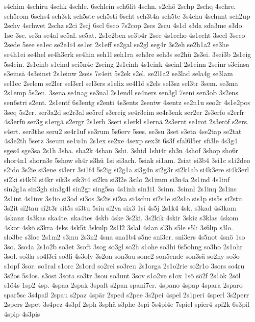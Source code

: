 {s4chim
4schiru
4schk
4schle.
6schlein
sch6lit
4schn.
s2chö
2schp
2schq
4schre.
sch5rom
6schs4
sch3sk
sch5ste
sch5sti
6scht
sch3t4a
sch5te
3s4chu
4schunt
sch2up
2schv
4schwet
2schz
s2ci
2scj
6scl
6sco
7s2cop
2scs
2scu
4s1d
s3da
sda3me
s3do
1se
3se.
se3a
se4al
se5al.
se5at.
2s1e2ben
se3b4r
2sec
4s1echo
4s1echt
3secl
3seco
2sede
5see
se1ec
se2e1i4
se1er
2s1eff
se2gal
se2gl
seg4r
3s2eh
se2h1a2
se3he
se4h1ei
se4hel
se4h3erk
se4hin
seh1l
seh1ra
seh3re
seh3s
se2hü
2s3ei.
3sei3b
2s1eig
5s4ein.
2s1einb
s1eind
sei5n4e
2seing
2s1einh
4s1eink
4seinl
2s1einn
2seinr
s3einsa
s3einsä
4s3einst
2s1einw
2seis
7s4eit
5s2ek
s2el.
se2l1a2
se3lad
sela4g
se3lam
sel1ec
2selem
se2ler
sel3erl
sel3ers
s1elix
se4l1ö
s2els
sel3sz
sel3tr
3sem.
se3ma
2s1emp
5s2en.
3sena
se4nag
se3nal
2s1endl
se4ners
sen3gl
7seni
sen3ob
3s2ens
sen6stri
s2ent.
2s1entf
6s3entg
s2enti
4s3ents
2sentw
4sentz
se2n1u
seo2r
4s1e2pos
3seq
5s2er.
ser3a2d
se2r3al
se5ref
s3ereig
se4r3eim
se4r3enk
ser2er
2s3erfo
s2erfr
4s3erfü
ser3g
s1ergä
s2ergr
2s1erh
3seri
s1erkl
s1ernä
2s3ernt
se1rot
2s3eröf
s2ers.
s4ert.
ser3the
seru2
se4r1uf
se3rum
5s6erv
5ses.
se3su
3set
s3eta
4se2tap
se2tat
4s3e2th
5setz
3seum
se1u4n
2s1ex
se2xe
4sexp
sex3t
6s3f
sfal6l5er
sfi3le
4s3g4
sges4
sge3sa
2s1h
3sha.
sha2k
4shan
3shi.
3shid
1shi4r
sh3n
4shof
3shop
sho6r
shor4n1
shorn3e
5show
sh4r
s3hü
1si
si3ach.
5siak
si1am.
2siat
si3b4
3si1c
s1i2deo
s2ido
3s2ie
si3ene
si3err
3si1f4
5s2ig
si2g1a
si3g4n
si2g3r
si2k1ab
si4k3ere
si4k3erl
si2ki
si4k5l
si4kr
sik3s
sik3t4
si2ku
si3l2e
3silo
2s1imm
si3n4a
2s1ind
4s1inf
sin2g1a
sin3gh
sin3g4l
sin2gr
sing5sa
4s1inh
sin1i1
3sinn.
3sinnl
2s1inq
2s1ins
2s1int
4s1inv
3s4io
si3od
si3os
3s2is
si2sa
si4schu
si2s1e
si2s1o
sis1p
sis5s
si2stu
3s2it
si2tau
si2t3r
sit5s
si3tu
5siu
si2va
six3
1sí
4s5j
2s1k4
4sk.
s3kad
4s3kam
4skanz
4s3kas
ska4te.
ska4tes
4skb
4ske
3s2ki.
3s2kik
4skir
3skiz
s3klas
4skom
4skor
4skö
s3kra
4sks
4sk5t
3skulp
2s1l2
3slal
4slan
sl3b
s5le
s5li
3s6lip
s3lo.
slo3be
s3loe
2s1m2
s3mu
2s3n2
4sna
sna1b4
s5ne
sni3er.
sni3ers
4s5not
4snö
1so
3so.
3so4a
2s1o2b
so3et
3soft
3sog
so3gl
so2h
s1ohe
so3hi
6s5ohng
so3ho
2s1ohr
3sol.
so3la
so4l3ei
so3li
4s3oly
3s2on
son3au
sone2
son5ende
son3sä
so2ny
so3o
s1opf
3sor.
so1ral
s1orc
2s1ord
so2rei
so3ren
2s1orga
2s1o2rie
so2r1o
3sors
so4ru
3s2os
5s4os.
s3ost
3sota
so3tr
3sou
so3unt
3sov
s1o2ve
s1ox
1sö
sö2f
2s1ök
2söl
s1ö4s
1sp2
4sp.
4spaa
2spak
3spalt
s2pan
spani7er.
4spano
4spap
4spara
2sparo
spar5sc
3s4paß
2spau
s2paz
4spär
2sped
s2pee
3s2pei
4spel
2s1peri
4sperl
3s2perr
2spers
2spet
3s4pez
4s3pf
2sph
3sphä
s3phe
3spi
5s4pi4e
7spiel
spier4
spi2k
6s3pil
4spip
4s3pis
}
